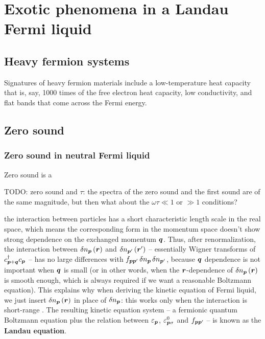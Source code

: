 \documentclass[hyperref, a4paper]{article}
\newcommand*{\concept}[1]{{\textbf{#1}}}
\begin{document}
\section{Exotic phenomena in a Landau Fermi liquid}

\subsection{Heavy fermion systems}

Signatures of heavy fermion materials include 
a low-temperature heat capacity that is, say, 1000 times 
of the free electron heat capacity,
low conductivity, 
and flat bands that come across the Fermi energy.


\subsection{Zero sound}

\subsubsection{Zero sound in neutral Fermi liquid}

Zero sound is a 

TODO: zero sound and $\tau$: 
the spectra of the zero sound and the first sound 
are of the same magnitude, 
but then what about the $\omega \tau \ll 1$ or $\gg 1$ conditions?

the interaction between particles has 
a short characteristic length scale in the real space,
which means the corresponding form in the momentum space 
doesn't show strong dependence on the exchanged momentum $\vb*{q}$.
Thus, after renormalization, the interaction between $\var{n}_{\vb*{p}}(\vb*{r})$
and $\var{n}_{\vb*{p}'} (\vb*{r}')$
-- essentially Wigner transforms of $c^\dagger_{\vb*{p} + \vb*{q}} c_{\vb*{p}}$ --
has no large differences with 
$f_{\vb*{p} \vb*{p}'} \var{n}_{\vb*{p}} \var{n}_{\vb*{p}'}$,
because $\vb*{q}$ dependence is not important when $\vb*{q}$ is small 
(or in other words, when the $\vb*{r}$-dependence of $\var{n_{\vb*{p}}}(\vb*{r})$
is smooth enough, which is always required if we want a reasonable Boltzmann equation).
This explains why when deriving the kinetic equation of Fermi liquid, 
we just insert $\var{n}_{\vb*{p}}(\vb*{r})$ in place of $\var{n}_{\vb*{p}}$:
this works only when the interaction is short-range
\cite{pines2018theory}.
The resulting kinetic equation system -- 
a fermionic quantum Boltzmann equation 
plus the relation between $\varepsilon_{\vb*{p}}$, 
$\varepsilon_{\vb*{p} \sigma}^0$ and $f_{\vb*{p} \vb*{p}'}$ -- 
is known as the \concept{Landau equation}.
\end{document}
